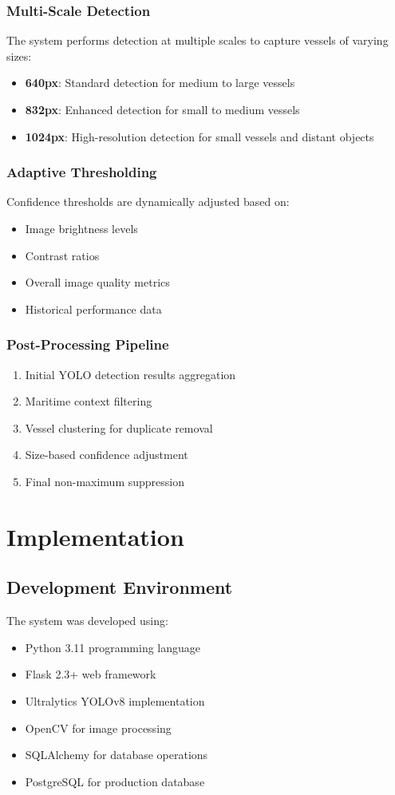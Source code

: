 \documentclass[12pt,a4paper]{report}
\begin{document}
\subsection{Multi-Scale Detection}
The system performs detection at multiple scales to capture vessels of varying sizes:
\begin{itemize}
    \item \textbf{640px}: Standard detection for medium to large vessels
    \item \textbf{832px}: Enhanced detection for small to medium vessels
    \item \textbf{1024px}: High-resolution detection for small vessels and distant objects
\end{itemize}

\subsection{Adaptive Thresholding}
Confidence thresholds are dynamically adjusted based on:
\begin{itemize}
    \item Image brightness levels
    \item Contrast ratios
    \item Overall image quality metrics
    \item Historical performance data
\end{itemize}

\subsection{Post-Processing Pipeline}
\begin{enumerate}
    \item Initial YOLO detection results aggregation
    \item Maritime context filtering
    \item Vessel clustering for duplicate removal
    \item Size-based confidence adjustment
    \item Final non-maximum suppression
\end{enumerate}

\chapter{Implementation}

\section{Development Environment}
The system was developed using:
\begin{itemize}
    \item Python 3.11 programming language
    \item Flask 2.3+ web framework
    \item Ultralytics YOLOv8 implementation
    \item OpenCV for image processing
    \item SQLAlchemy for database operations
    \item PostgreSQL for production database
\end{itemize}
\end{document}
